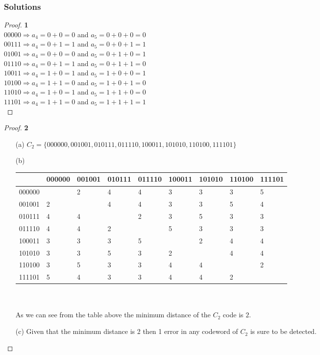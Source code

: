 \documentclass[11pt]{article}
\begin{document}
	\subsubsection*{Solutions}
	\begin{proof}{\textbf{1}}\\
		$00000 \Rightarrow a_4=0+0=0$ and $a_5=0+0+0=0$\\
		$00111 \Rightarrow a_4=0+1=1$ and $a_5=0+0+1=1$\\
		$01001 \Rightarrow a_4=0+0=0$ and $a_5=0+1+0=1$\\
		$01110 \Rightarrow a_4=0+1=1$ and $a_5=0+1+1=0$\\
		$10011 \Rightarrow a_4=1+0=1$ and $a_5=1+0+0=1$\\
		$10100 \Rightarrow a_4=1+1=0$ and $a_5=1+0+1=0$\\
		$11010 \Rightarrow a_4=1+0=1$ and $a_5=1+1+0=0$\\
		$11101 \Rightarrow a_4=1+1=0$ and $a_5=1+1+1=1$\\
	\end{proof}
	\begin{proof}{\textbf{2}}
		\begin{itemize}
			\item [(a)] $C_2 = \{000000,001001,010111,011110,100011,101010,110100,111101\}$
			\item [(b)] ${}$\\
				\begin{adjustbox}{max width=\textwidth,center}
				\begin{tabular}{l|llllllll}
				 & 000000 & 001001 & 010111 & 011110 & 100011 & 101010 & 110100 & 111101 \\ \hline
				000000 &  & 2 & 4 & 4 & 3 & 3 & 3 & 5 \\
				001001 & 2 &  & 4 & 4 & 3 & 3 & 5 & 4 \\
				010111 & 4 & 4 &  & 2 & 3 & 5 & 3 & 3 \\
				011110 & 4 & 4 & 2 &  & 5 & 3 & 3 & 3 \\
				100011 & 3 & 3 & 3 & 5 &  & 2 & 4 & 4 \\
				101010 & 3 & 3 & 5 & 3 & 2 &  & 4 & 4 \\
				110100 & 3 & 5 & 3 & 3 & 4 & 4 &  & 2 \\
				111101 & 5 & 4 & 3 & 3 & 4 & 4 & 2 &  \\
				\end{tabular}
				\end{adjustbox}
			\\\\As we can see from the table above the minimum distance of the $C_2$ code is $2$.
			\item [(c)] Given that the minimum distance is 2 then 1 error in any codeword of $C_2$ is sure to be detected.
		\end{itemize}
	\end{proof}
\end{document}
